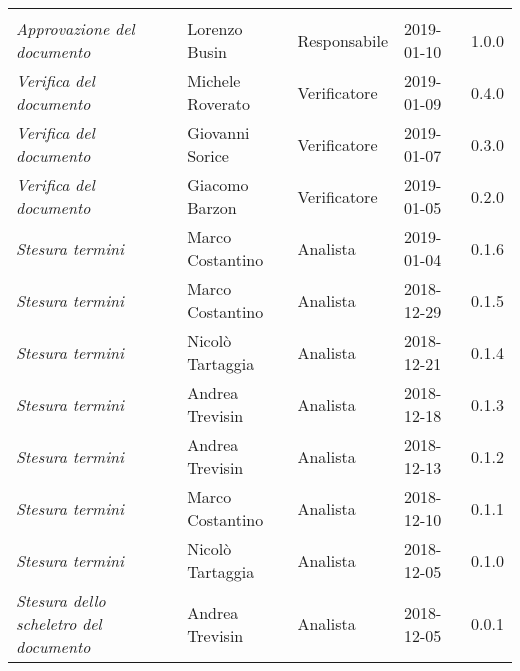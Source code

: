 \newpage 
\section*{}
\begin{table}[H]
	\centering
	\begin{tabular}{p{4cm}|C{3cm}|C{3cm}|R{2.5cm}|R{2cm}}
		
		 & & & & \\
		
		
		\emph{Approvazione del documento} & Lorenzo Busin & Responsabile & 2019-01-10 & 1.0.0 \\
		\hline
		
		\emph{Verifica del documento} & Michele Roverato & Verificatore & 2019-01-09 & 0.4.0 \\
		\hline
		
		\emph{Verifica del documento} & Giovanni Sorice & Verificatore & 2019-01-07 & 0.3.0 \\
		\hline
		
		\emph{Verifica del documento} & Giacomo Barzon & Verificatore & 2019-01-05 & 0.2.0 \\
		\hline
		
		\emph{Stesura termini} & Marco Costantino & Analista & 2019-01-04 & 0.1.6 \\
		\hline
		
		\emph{Stesura termini} & Marco Costantino & Analista & 2018-12-29 & 0.1.5 \\
		\hline
		
		\emph{Stesura termini} & Nicolò Tartaggia & Analista & 2018-12-21 & 0.1.4 \\
		\hline
		
		\emph{Stesura termini} & Andrea Trevisin & Analista & 2018-12-18 & 0.1.3 \\
		\hline
		
		\emph{Stesura termini} & Andrea Trevisin & Analista & 2018-12-13 & 0.1.2 \\
		\hline
		
		\emph{Stesura termini} & Marco Costantino & Analista & 2018-12-10 & 0.1.1 \\
		\hline
		
		\emph{Stesura termini} & Nicolò Tartaggia & Analista & 2018-12-05 & 0.1.0 \\
		\hline
		
		\emph{Stesura dello scheletro del documento} & Andrea Trevisin & Analista & 2018-12-05 & 0.0.1 \\
		
	\end{tabular}
	
\end{table}


\clearpage